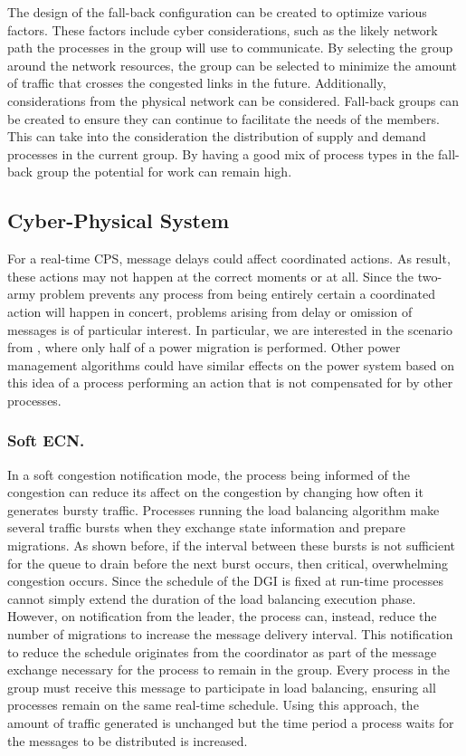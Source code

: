 The design of the fall-back configuration can be created to optimize various factors.
These factors include cyber considerations, such as the likely network path the processes in the group will use to communicate.
By selecting the group around the network resources, the group can be selected to minimize the amount of traffic that crosses the congested links in the future.
Additionally, considerations from the physical network can be considered.
Fall-back groups can be created to ensure they can continue to facilitate the needs of the members.
This can take into the consideration the distribution of supply and demand processes in the current group.
By having a good mix of process types in the fall-back group the potential for work can remain high.

\subsection{Cyber-Physical System}

For a real-time \ac{CPS}, message delays could affect coordinated actions.
As result, these actions may not happen at the correct moments or at all.
Since the two-army problem prevents any process from being entirely certain a coordinated action will happen in concert, problems arising from delay or omission of messages is of particular interest.
In particular, we are interested in the scenario from \cite{HARINI}, where only half of a power migration is performed.
Other power management algorithms could have similar effects on the power system based on this idea of a process performing an action that is not compensated for by other processes.

\subsubsection{Soft \ac{ECN}.}

In a soft congestion notification mode, the process being informed of the congestion can reduce its affect on the congestion by changing how often it generates bursty traffic.
Processes running the load balancing algorithm make several traffic bursts when they exchange state information and prepare migrations.
As shown before, if the interval between these bursts is not sufficient for the queue to drain before the next burst occurs, then critical, overwhelming congestion occurs.
Since the schedule of the \ac{DGI} is fixed at run-time processes cannot simply extend the duration of the load balancing execution phase.
However, on notification from the leader, the process can, instead, reduce the number of migrations to increase the message delivery interval.
This notification to reduce the schedule originates from the coordinator as part of the message exchange necessary for the process to remain in the group.
Every process in the group must receive this message to participate in load balancing, ensuring all processes remain on the same real-time schedule.
Using this approach, the amount of traffic generated is unchanged but the time period a process waits for the messages to be distributed is increased.

